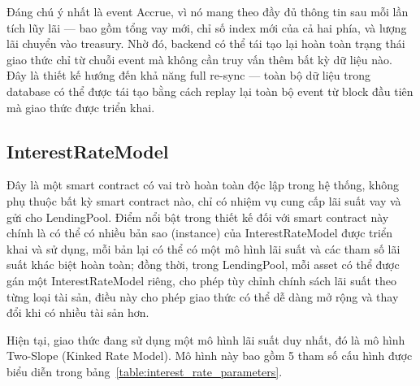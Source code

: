\documentclass[../DoAn.tex]{subfiles}
\begin{document}
Đáng chú ý nhất là event Accrue, vì nó mang theo đầy đủ thông tin sau mỗi lần tích lũy lãi --- bao gồm tổng vay mới, chỉ số index mới của cả hai phía, và lượng lãi chuyển vào treasury. Nhờ đó, backend có thể tái tạo lại hoàn toàn trạng thái giao thức chỉ từ chuỗi event mà không cần truy vấn thêm bất kỳ dữ liệu nào. Đây là thiết kế hướng đến khả năng full re-sync --- toàn bộ dữ liệu trong database có thể được tái tạo bằng cách replay lại toàn bộ event từ block đầu tiên mà giao thức được triển khai.

\subsection{InterestRateModel}


Đây là một smart contract có vai trò hoàn toàn độc lập trong hệ thống, không phụ thuộc bất kỳ smart contract nào, chỉ có nhiệm vụ cung cấp lãi suất vay và gửi cho LendingPool. Điểm nổi bật trong thiết kế đối với smart contract này chính là có thể có nhiều bản sao (instance) của InterestRateModel được triển khai và sử dụng, mỗi bản lại có thể có một mô hình lãi suất và các tham số lãi suất khác biệt hoàn toàn; đồng thời, trong LendingPool, mỗi asset có thể được gán một InterestRateModel riêng, cho phép tùy chỉnh chính sách lãi suất theo từng loại tài sản, điều này cho phép giao thức có thể dễ dàng mở rộng và thay đổi khi có nhiều tài sản hơn.

Hiện tại, giao thức đang sử dụng một mô hình lãi suất duy nhất, đó là mô hình Two-Slope (Kinked Rate Model). Mô hình này bao gồm 5 tham số cấu hình được biểu diễn trong bảng~\ref{table:interest_rate_parameters}.

\begin{table}[H]
\centering
{}
\caption{Các tham số mô hình lãi suất}
\label{table:interest_rate_parameters}
\end{table}
\end{document}
